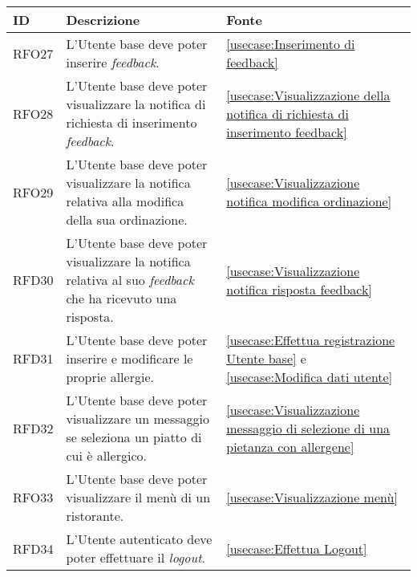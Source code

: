 \begin{table}[H]
	\renewcommand{\arraystretch}{1.5}
	\centering
	\begin{tabularx}{\textwidth}{l|X|p{2cm}}
		\textbf{ID} & \textbf{Descrizione}                                                                                                 & \textbf{Fonte}                                                                                \\
		\hline
		RFO27       & L'Utente base deve poter inserire \textit{feedback}.                                                                 & \autoref{usecase:Inserimento di feedback}                                                     \\
		\hline
		RFO28       & L'Utente base deve poter visualizzare la notifica di richiesta di inserimento \textit{feedback}.                     & \autoref{usecase:Visualizzazione della notifica di richiesta di inserimento feedback}         \\
		\hline
		RFO29       & L'Utente base deve poter visualizzare la notifica relativa alla modifica della sua ordinazione.                      & \autoref{usecase:Visualizzazione notifica modifica ordinazione}                               \\
		\hline
		RFD30       & L'Utente base deve poter visualizzare la notifica relativa al suo \textit{feedback} che ha ricevuto una risposta.    & \autoref{usecase:Visualizzazione notifica risposta feedback}                                  \\
		\hline
		RFD31       & L'Utente base deve poter inserire e modificare le proprie allergie.                                                  & \autoref{usecase:Effettua registrazione Utente base} e \autoref{usecase:Modifica dati utente} \\
		\hline
		RFD32       & L'Utente base deve poter visualizzare un messaggio se seleziona un piatto di cui è allergico.                        & \autoref{usecase:Visualizzazione messaggio di selezione di una pietanza con allergene}        \\
		\hline
		RFO33       & L'Utente base deve poter visualizzare il menù di un ristorante.                                                      & \autoref{usecase:Visualizzazione menù}                                                        \\
		\hline
		RFD34       & L'Utente autenticato deve poter effettuare il \textit{logout}.                                                       & \autoref{usecase:Effettua Logout}                                                             \\

\end{tabularx}
\end{table}
